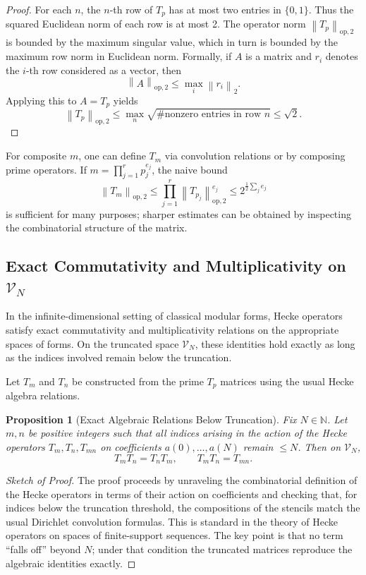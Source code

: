 \documentclass[11pt]{article}
\theoremstyle{definition}
\theoremstyle{plain}
\newtheorem{proposition}[definition]{Proposition}
\theoremstyle{remark}
\newcommand{\Vcal}{\mathcal{V}}
\newcommand{\Nbb}{\mathbb{N}}
\newcommand{\norm}[1]{\left\lVert #1 \right\rVert}
\begin{document}
\begin{proof}
For each \(n\), the \(n\)-th row of \(T_p\) has at most two entries in \(\{0,1\}\).
Thus the squared Euclidean norm of each row is at most 2.
The operator norm \(\norm{T_p}_{\mathrm{op},2}\) is bounded by the maximum singular value, which in turn is bounded by the maximum row norm in Euclidean norm.
Formally, if \(A\) is a matrix and \(r_i\) denotes the \(i\)-th row considered as a vector, then
\[
  \norm{A}_{\mathrm{op},2} \le \max_i \norm{r_i}_2.
\]
Applying this to \(A = T_p\) yields
\[
  \norm{T_p}_{\mathrm{op},2} \le \max_n \sqrt{\#\text{nonzero entries in row }n} \le \sqrt{2}.
\]
\end{proof}

For composite \(m\), one can define \(T_m\) via convolution relations or by composing prime operators.
If \(m = \prod_{j=1}^r p_j^{e_j}\), the naive bound
\[
  \norm{T_m}_{\mathrm{op},2} \le \prod_{j=1}^r \norm{T_{p_j}}_{\mathrm{op},2}^{e_j} \le 2^{\frac{1}{2}\sum_j e_j}
\]
is sufficient for many purposes; sharper estimates can be obtained by inspecting the combinatorial structure of the matrix.

\subsection{Exact Commutativity and Multiplicativity on \(\Vcal_N\)}

In the infinite-dimensional setting of classical modular forms, Hecke operators satisfy exact commutativity and multiplicativity relations on the appropriate spaces of forms.
On the truncated space \(\Vcal_N\), these identities hold exactly as long as the indices involved remain below the truncation.

Let \(T_m\) and \(T_n\) be constructed from the prime \(T_p\) matrices using the usual Hecke algebra relations.

\begin{proposition}[Exact Algebraic Relations Below Truncation]
Fix \(N\in\Nbb\).
Let \(m,n\) be positive integers such that all indices arising in the action of the Hecke operators \(T_m, T_n, T_{mn}\) on coefficients \(a(0),\dotsc,a(N)\) remain \(\le N\).
Then on \(\Vcal_N\),
\[
  T_m T_n = T_n T_m,\qquad T_m T_n = T_{mn}.
\]
\end{proposition}

\begin{proof}[Sketch of Proof]
The proof proceeds by unraveling the combinatorial definition of the Hecke operators in terms of their action on coefficients and checking that, for indices below the truncation threshold, the compositions of the stencils match the usual Dirichlet convolution formulas.
This is standard in the theory of Hecke operators on spaces of finite-support sequences.
The key point is that no term ``falls off'' beyond \(N\); under that condition the truncated matrices reproduce the algebraic identities exactly.
\end{proof}
\end{document}
